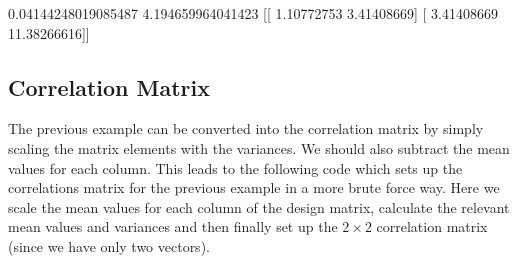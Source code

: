\documentclass[letterpaper,10pt,english]{sphinxmanual}
\begin{document}
\begin{sphinxVerbatim}[commandchars=\\\{\}]
0.04144248019085487
4.194659964041423
[[ 1.10772753  3.41408669]
 [ 3.41408669 11.38266616]]
\end{sphinxVerbatim}


\subsection{Correlation Matrix}
\label{\detokenize{chapter4:correlation-matrix}}
The previous example can be converted into the correlation matrix by
simply scaling the matrix elements with the variances.  We should also
subtract the mean values for each column. This leads to the following
code which sets up the correlations matrix for the previous example in
a more brute force way. Here we scale the mean values for each column of the design matrix, calculate the relevant mean values and variances and then finally set up the \(2\times 2\) correlation matrix (since we have only two vectors).
\end{document}
